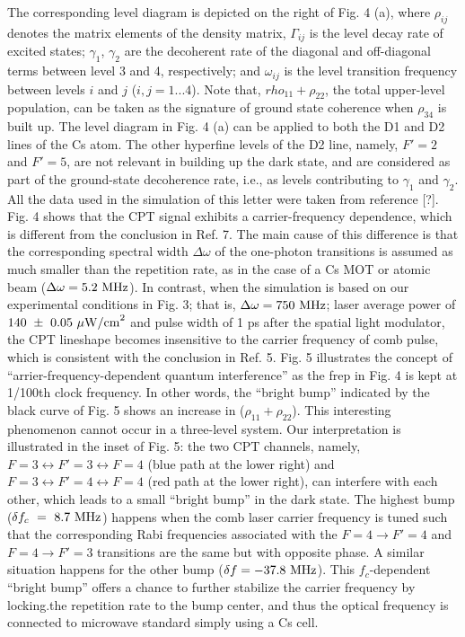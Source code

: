 \documentclass[%
aps,
prl,
showpacs,
twocolumn,
]{revtex4}
\begin{document}
The corresponding level diagram is 
depicted on the right of Fig. 4 (a), where $\rho_{ij}$ denotes the matrix elements of the  density matrix, $\Gamma_{ij}$ is the level decay rate of excited states; $\gamma_1$, $\gamma_2$ 
are the decoherent rate of the diagonal and off-diagonal terms between level 3 and 4, 
respectively; and $\omega_{ij}$ is the level transition frequency between levels $i$ and $j$ ($i,j=1...4$). Note that,
$rho_{11}+\rho_{22}$, the total upper-level population, can be taken as the signature of ground 
state coherence when $\rho_{34}$ is built up. The level diagram in Fig. 4 (a) can be applied 
to both the D1 and D2 lines of the Cs atom. The other hyperfine levels of the D2 line,
namely, $F'=2$ and $F'=5$, are not relevant in building up the dark state, and are 
considered as part of the ground-state decoherence rate, i.e., as levels contributing 
to $\gamma_1$ and $\gamma_2$. All the data used in the simulation of this letter were taken from 
reference [?]. Fig. 4 shows that the CPT signal exhibits a carrier-frequency dependence, 
which is different from the conclusion in Ref. 7. The main cause of this difference 
is that the corresponding spectral width $\Delta \omega$ of the one-photon transitions is 
assumed as much smaller than the repetition rate, as in the case of a Cs MOT 
or atomic beam ($\Delta \omega = 5.2~{\rm MHz}$). In contrast, when the simulation is based on our experimental conditions in Fig. 3; that is, $\Delta \omega = 750~{\rm MHz}$; laser average power of
$140~\pm~0.05~\mu{\rm W/cm}^2$ and pulse width of 1 ps after the spatial light modulator, the 
CPT lineshape becomes insensitive to the carrier frequency of comb pulse, which 
is consistent with the conclusion in Ref. 5. Fig. 5 illustrates the concept of 
``arrier-frequency-dependent quantum interference'' as the frep in Fig. 4 is kept 
at 1/100th clock frequency. In other words, the ``bright bump'' indicated by the 
black curve of Fig. 5 shows an increase in ($\rho_{11}+\rho_{22}$). This interesting phenomenon cannot occur in a three-level system. Our interpretation is illustrated in the inset 
of Fig. 5: the two CPT channels, namely, $F=3 \leftrightarrow F'=3 \leftrightarrow F=4$ (blue path at the lower right) 
and $F=3 \leftrightarrow F'=4 \leftrightarrow F=4$ (red path at the lower right), can interfere with each other, 
which leads to a small ``bright bump'' in the dark state. The highest bump ($\delta f_c~=~8.7~{\rm MHz}$) 
happens when the comb laser carrier frequency is tuned such that the corresponding Rabi 
frequencies associated with the $F=4 \rightarrow F'=4$ and $F=4 \rightarrow F'=3$ transitions are the same but with 
opposite phase.  A similar situation happens for the other bump ($\delta f = -37.8~{\rm MHz}$). This 
$f_c$-dependent ``bright bump'' offers a chance to further stabilize the carrier frequency 
by locking.the repetition rate to the bump center, and thus the optical frequency is 
connected to microwave standard simply using a Cs cell.    
\end{document}
